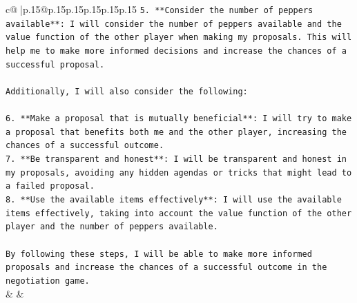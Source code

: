 \documentclass{article}
\begin{document}
{\begin{supertabular}{c@{$\;$}|p{.15\linewidth}@{}p{.15\linewidth}p{.15\linewidth}p{.15\linewidth}p{.15\linewidth}p{.15\linewidth}}
{{{\texttt{5. **Consider the number of peppers available**: I will consider the number of peppers available and the value function of the other player when making my proposals. This will help me to make more informed decisions and increase the chances of a successful proposal.} \\
\\ 
\texttt{Additionally, I will also consider the following:} \\
\\ 
\texttt{6. **Make a proposal that is mutually beneficial**: I will try to make a proposal that benefits both me and the other player, increasing the chances of a successful outcome.} \\
\texttt{7. **Be transparent and honest**: I will be transparent and honest in my proposals, avoiding any hidden agendas or tricks that might lead to a failed proposal.} \\
\texttt{8. **Use the available items effectively**: I will use the available items effectively, taking into account the value function of the other player and the number of peppers available.} \\
\\ 
\texttt{By following these steps, I will be able to make more informed proposals and increase the chances of a successful outcome in the negotiation game.} \\
            }
        }
    }
    & & \\ \\


\end{supertabular}}
\end{document}
